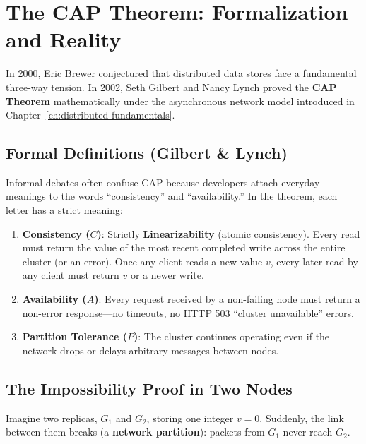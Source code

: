 \section{The CAP Theorem: Formalization and Reality}

In 2000, Eric Brewer conjectured that distributed data stores face a fundamental three-way tension. In 2002, Seth Gilbert and Nancy Lynch proved the \textbf{CAP Theorem} mathematically under the asynchronous network model introduced in Chapter~\ref{ch:distributed-fundamentals}.

\subsection{Formal Definitions (Gilbert \protect\& Lynch)}

Informal debates often confuse CAP because developers attach everyday meanings to the words ``consistency'' and ``availability.'' In the theorem, each letter has a strict meaning:
\begin{enumerate}[leftmargin=18pt]
  \item \textbf{Consistency ($C$)}: Strictly \textbf{Linearizability} (atomic consistency). Every read must return the value of the most recent completed write across the entire cluster (or an error). Once any client reads a new value $v$, every later read by any client must return $v$ or a newer write.
  \item \textbf{Availability ($A$)}: Every request received by a non-failing node must return a non-error response---no timeouts, no HTTP 503 ``cluster unavailable'' errors.
  \item \textbf{Partition Tolerance ($P$)}: The cluster continues operating even if the network drops or delays arbitrary messages between nodes.
\end{enumerate}

\subsection{The Impossibility Proof in Two Nodes}

Imagine two replicas, $G_1$ and $G_2$, storing one integer $v = 0$. Suddenly, the link between them breaks (a \textbf{network partition}): packets from $G_1$ never reach $G_2$.

